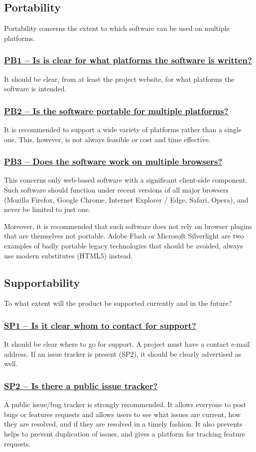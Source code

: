 \documentclass[a4paper,11pt]{article}
\newcommand{\indicator}[1]{\subsubsection*{\underline{#1}}}
\begin{document}
\subsection{Portability}

Portability concerns the extent to which software can be used on multiple
platforms. 

\indicator{PB1 -- Is is clear for what platforms the software is written?}

It should be clear, from at least the project website, for what platforms the software
is intended.

\indicator{PB2 -- Is the software portable for multiple platforms?}

It is recommended to support a wide variety of platforms rather than a single
one. This, however, is not always feasible or cost and time effective.

\indicator{PB3 -- Does the software work on multiple browsers?}

This concerns only web-based software with a significant client-side component.
Such software should function under recent versions of all major browsers
(Mozilla Firefox, Google Chrome, Internet Explorer / Edge, Safari, Opera), and
never be limited to just one.

Moreover, it is recommended that such software does not rely on browser plugins that
are themselves not portable. Adobe Flash or Microsoft Silverlight are two
examples of badly portable legacy technologies that should be avoided, always use
modern substitutes (HTML5) instead.

\subsection{Supportability}

To what extent will the product be supported currently and in the future?

\indicator{SP1 -- Is it clear whom to contact for support?}

It should be clear where to go for support. A project must have a contact
e-mail address. If an issue tracker is present (SP2), it should be clearly advertised
as well.

\indicator{SP2 -- Is there a public issue tracker?}

A public issue/bug tracker is strongly recommended. It allows everyone to post
bugs or features requests and allows users to see what issues are current, how
they are resolved, and if they are resolved in a timely fashion. It also
prevents helps to prevent duplication of issues, and gives a platform for
tracking feature requests.
\end{document}
